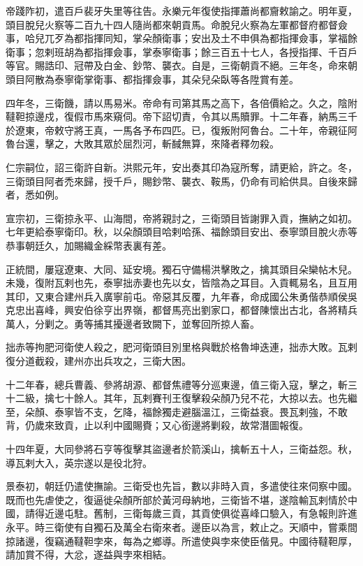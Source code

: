 \begin{pinyinscope}
帝踐阼初，遣百戶裴牙失里等往告。永樂元年復使指揮蕭尚都齎敕諭之。明年夏，頭目脫兒火察等二百九十四人隨尚都來朝貢馬。命脫兒火察為左軍都督府都督僉事，哈兒兀歹為都指揮同知，掌朵顏衛事；安出及土不申俱為都指揮僉事，掌福餘衛事；忽剌班胡為都指揮僉事，掌泰寧衛事；餘三百五十七人，各授指揮、千百戶等官。賜誥印、冠帶及白金、鈔幣、襲衣。自是，三衛朝貢不絕。三年冬，命來朝頭目阿散為泰寧衛掌衛事、都指揮僉事，其朵兒朵臥等各陞賞有差。

四年冬，三衛饑，請以馬易米。帝命有司第其馬之高下，各倍價給之。久之，陰附韃靼掠邊戍，復假市馬來窺伺。帝下詔切責，令其以馬贖罪。十二年春，納馬三千於遼東，帝敕守將王真，一馬各予布四匹。已，復叛附阿魯台。二十年，帝親征阿魯台還，擊之，大敗其眾於屈烈河，斬馘無算，來降者釋勿殺。

仁宗嗣位，詔三衛許自新。洪熙元年，安出奏其印為寇所奪，請更給，許之。冬，三衛頭目阿者禿來歸，授千戶，賜鈔幣、襲衣、鞍馬，仍命有司給供具。自後來歸者，悉如例。

宣宗初，三衛掠永平、山海間，帝將親討之，三衛頭目皆謝罪入貢，撫納之如初。七年更給泰寧衛印。秋，以朵顏頭目哈剌哈孫、福餘頭目安出、泰寧頭目脫火赤等恭事朝廷久，加賜織金綵幣表裏有差。

正統間，屢寇遼東、大同、延安境。獨石守備楊洪擊敗之，擒其頭目朵欒帖木兒。未幾，復附瓦剌也先，泰寧拙赤妻也先以女，皆陰為之耳目。入貢輒易名，且互用其印，又東合建州兵入廣寧前屯。帝惡其反覆，九年春，命成國公朱勇偕恭順侯吳克忠出喜峰，興安伯徐亨出界嶺，都督馬亮出劉家口，都督陳懷出古北，各將精兵萬人，分剿之。勇等捕其擾邊者致闕下，並奪回所掠人畜。

拙赤等拘肥河衛使人殺之，肥河衛頭目別里格與戰於格魯坤迭連，拙赤大敗。瓦剌復分道截殺，建州亦出兵攻之，三衛大困。

十二年春，總兵曹義、參將胡源、都督焦禮等分巡東邊，值三衛入寇，擊之，斬三十二級，擒七十餘人。其年，瓦剌賽刊王復擊殺朵顏乃兒不花，大掠以去。也先繼至，朵顏、泰寧皆不支，乞降，福餘獨走避腦溫江，三衛益衰。畏瓦剌強，不敢背，仍歲來致貢，止以利中國賜賚；又心銜邊將剿殺，故常潛圖報復。

十四年夏，大同參將石亨等復擊其盜邊者於箭溪山，擒斬五十人，三衛益怨。秋，導瓦剌大入，英宗遂以是役北狩。

景泰初，朝廷仍遣使撫諭。三衛受也先旨，數以非時入貢，多遣使往來伺察中國。既而也先虐使之，復逼徙朵顏所部於黃河母納地，三衛皆不堪，遂陰輸瓦剌情於中國，請得近邊屯駐。舊制，三衛每歲三貢，其貢使俱從喜峰口驗入，有急報則許進永平。時三衛使有自獨石及萬全右衛來者。邊臣以為言，敕止之。天順中，嘗乘間掠諸邊，復竊通韃靼孛來，每為之鄉導。所遣使與孛來使臣偕見。中國待韃靼厚，請加賞不得，大忿，遂益與孛來相結。


\end{pinyinscope}
